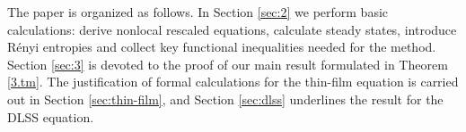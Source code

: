 \documentclass[12pt]{amsart}
\let\pa\partial
\newcommand{\R}{{\mathbb R}}
\theoremstyle{plain}
\theoremstyle{definition}
\theoremstyle{remark}
\begin{document}
The paper is organized as follows. In Section \ref{sec:2} we perform basic calculations: derive nonlocal rescaled equations, calculate steady states, introduce R\'enyi entropies and collect key functional inequalities needed for the method. Section \ref{sec:3} is devoted to the proof of our main result formulated in Theorem \ref{3.tm}. The justification of formal calculations for the thin-film equation is carried out in Section \ref{sec:thin-film}, and Section \ref{sec:dlss} underlines the result for the DLSS equation. 

\end{document}
